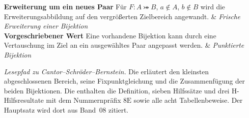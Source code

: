\begin{BandUebersicht}
\textbf{Erweiterung um ein neues Paar}
Für \(F\colon A\bij B\), \(a\notin A\), \(b\notin B\)
wird die Erweiterungsabbildung auf den vergrößerten Zielbereich angewandt.
&
\textit{Frische Erweiterung einer Bijektion}
\\
\addlinespace[.8ex]
\textbf{Vorgeschriebener Wert}
Eine vorhandene Bijektion kann durch eine Vertauschung im Ziel
an ein ausgewähltes Paar angepasst werden.
&
\textit{Punktierte Bijektion}
\\
\end{BandUebersicht}
\noindent\emph{Lesepfad zu Cantor--Schröder--Bernstein.}
Die \CSBReadingLink{} erläutert den kleinsten abgeschlossenen Bereich,
seine Fixpunktgleichung und die Zusammenfügung der beiden Bijektionen.
Die \CSBProofsLink{} enthalten die Definition, sieben Hilfssätze und
drei H-Hilfsresultate mit dem Nummernpräfix \(8\mathrm E\) sowie alle
acht Tabellenbeweise. Der Hauptsatz wird dort aus Band~08 zitiert.
